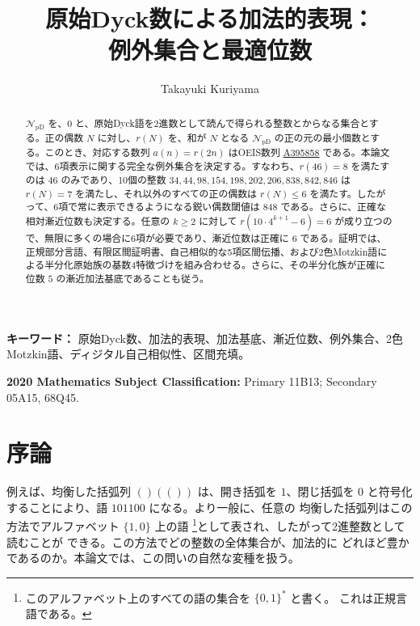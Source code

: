 \documentclass[12pt]{ltjsarticle}
\title{原始Dyck数による加法的表現：\\例外集合と最適位数}
\author{Takayuki Kuriyama}
\date{}
\theoremstyle{plain}
\theoremstyle{definition}
\theoremstyle{plain}
\newcommand{\NpD}{\mathcal{N}_{\mathrm{pD}}}
\newcommand{\seqnum}[1]{\href{https://oeis.org/#1}{\textrm{\underline{#1}}}}
\begin{document}
\maketitle

\begin{abstract}
$\NpD$ を、$0$ と、原始Dyck語を2進数として読んで得られる整数とからなる集合とする。正の偶数 $N$ に対し、$r(N)$ を、和が $N$ となる $\NpD$ の正の元の最小個数とする。このとき、対応する数列 $a(n)=r(2n)$ はOEIS数列 \seqnum{A395858} である。本論文では、6項表示に関する完全な例外集合を決定する。すなわち、$r(46)=8$ を満たすのは $46$ のみであり、10個の整数
$34,44,98,154,198,202,206,838,842,846$ は $r(N)=7$ を満たし、それ以外のすべての正の偶数は $r(N)\leq6$ を満たす。したがって、6項で常に表示できるようになる鋭い偶数閾値は $848$ である。さらに、正確な相対漸近位数も決定する。任意の $k\geq2$ に対して
$r(10\cdot4^{k+1}-6)=6$ が成り立つので、無限に多くの場合に6項が必要であり、漸近位数は正確に $6$ である。証明では、正規部分言語、有限区間証明書、自己相似的な5項区間伝播、および2色Motzkin語による半分化原始族の基数4特徴づけを組み合わせる。さらに、その半分化族が正確に位数 $5$ の漸近加法基底であることも従う。
\end{abstract}

\noindent\textbf{キーワード：} 原始Dyck数、加法的表現、加法基底、漸近位数、例外集合、2色Motzkin語、ディジタル自己相似性、区間充填。

\noindent\textbf{2020 Mathematics Subject Classification:} Primary 11B13;
Secondary 05A15, 68Q45.

\section{序論}\label{sec:introduction}

例えば、均衡した括弧列 $()(())$ は、開き括弧を $1$、閉じ括弧を
$0$ と符号化することにより、語 $101100$ になる。より一般に、任意の
均衡した括弧列はこの方法でアルファベット $\{1,0\}$ 上の語
\footnote{このアルファベット上のすべての語の集合を $\{0,1\}^*$ と書く。
これは正規言語である。}として表され、したがって2進整数として読むことが
できる。この方法でどの整数の全体集合が、加法的に
どれほど豊かであるのか。本論文では、この問いの自然な変種を扱う。
\end{document}
